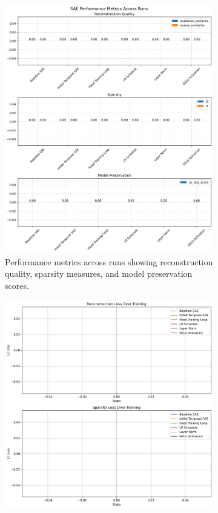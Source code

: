 \documentclass{article} %
\begin{document}
\begin{figure}[h]
    \centering
    \begin{subfigure}{0.49\textwidth}
        \includegraphics[width=\textwidth]{metrics_comparison.png}
        \caption{Performance metrics across runs showing reconstruction quality, sparsity measures, and model preservation scores.}
        \label{fig:metrics_comparison}
    \end{subfigure}
    \hfill
    \begin{subfigure}{0.49\textwidth}
        \includegraphics[width=\textwidth]{training_curves.png}

\end{subfigure}
\end{figure}
\end{document}
